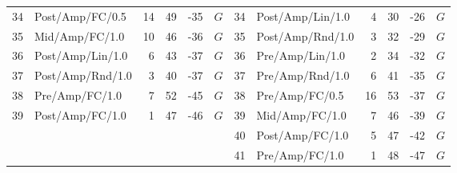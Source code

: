\begin{table}[!t]
\begin{tabular}{rlrrrlrlrrrl}
34 & Post/Amp/FC/0.5 & 14 & 49 & -35 & $G$ & 34 & Post/Amp/Lin/1.0 & 4 & 30 & -26 & $G$ \\
35 & Mid/Amp/FC/1.0 & 10 & 46 & -36 & $G$ & 35 & Post/Amp/Rnd/1.0 & 3 & 32 & -29 & $G$ \\
36 & Post/Amp/Lin/1.0 & 6 & 43 & -37 & $G$ & 36 & Pre/Amp/Lin/1.0 & 2 & 34 & -32 & $G$ \\
37 & Post/Amp/Rnd/1.0 & 3 & 40 & -37 & $G$ & 37 & Pre/Amp/Rnd/1.0 & 6 & 41 & -35 & $G$ \\
38 & Pre/Amp/FC/1.0 & 7 & 52 & -45 & $G$ & 38 & Pre/Amp/FC/0.5 & 16 & 53 & -37 & $G$ \\
39 & Post/Amp/FC/1.0 & 1 & 47 & -46 & $G$ & 39 & Mid/Amp/FC/1.0 & 7 & 46 & -39 & $G$ \\
 &  &  &  &  &  & 40 & Post/Amp/FC/1.0 & 5 & 47 & -42 & $G$ \\
 &  &  &  &  &  & 41 & Pre/Amp/FC/1.0 & 1 & 48 & -47 & $G$ \\
\bottomrule
\end{tabular}
\end{table}
